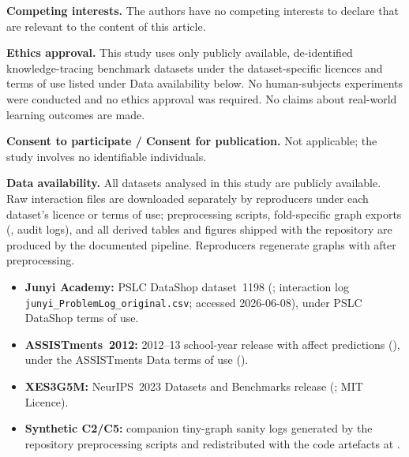 \documentclass[pdflatex,sn-mathphys-num]{sn-jnl}
\begin{document}
\medskip\noindent\textbf{Competing interests.} The authors have no competing
interests to declare that are relevant to the content of this article.

\medskip\noindent\textbf{Ethics approval.} This study uses only publicly
available, de-identified knowledge-tracing benchmark datasets under the
dataset-specific licences and terms of use listed under Data availability
below. No human-subjects experiments were conducted and no ethics approval was
required. No claims about real-world learning outcomes are made.

\medskip\noindent\textbf{Consent to participate / Consent for publication.} Not
applicable; the study involves no identifiable individuals.

\medskip\noindent\textbf{Data availability.} All datasets analysed in this study
are publicly available. Raw interaction files are downloaded separately by
reproducers under each dataset's licence or terms of use; preprocessing
scripts, fold-specific graph exports (, audit
logs), and all derived tables and figures shipped with the repository are
produced by the documented pipeline. Reproducers regenerate graphs with
 after preprocessing.
\begin{itemize}
  \item \textbf{Junyi Academy:} PSLC DataShop dataset~1198
  (;
  interaction log \texttt{junyi\_ProblemLog\_original.csv}; accessed
  2026-06-08), under PSLC DataShop terms of use.
  \item \textbf{ASSISTments~2012:} 2012--13 school-year release with affect
  predictions
  (),
  under the ASSISTments Data terms of use
  ().
  \item \textbf{XES3G5M:} NeurIPS~2023 Datasets and Benchmarks release
  (; MIT Licence).
  \item \textbf{Synthetic C2/C5:} companion tiny-graph sanity logs generated by
  the repository preprocessing scripts and redistributed with the code artefacts
  at .
\end{itemize}
\end{document}
